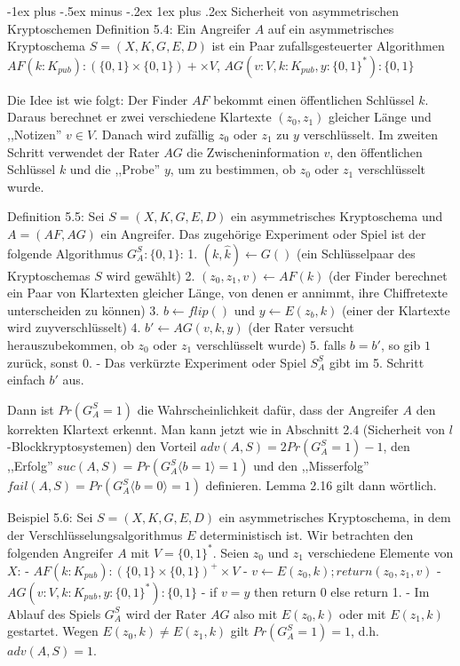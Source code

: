 \documentclass[a4paper]{article}
\makeatletter
\renewcommand{\subsubsection}{\@startsection{subsubsection}{3}{0mm}%
 {-1ex plus -.5ex minus -.2ex}%
 {1ex plus .2ex}%
 {\normalfont\small\bfseries}}
\makeatother
\begin{document}
\begin{multicols}{3}
        \subsubsection{Sicherheit von asymmetrischen Kryptoschemen}
        Definition 5.4: Ein Angreifer $A$ auf ein asymmetrisches Kryptoschema $S= (X,K,G,E,D)$ ist ein Paar zufallsgesteuerter Algorithmen $AF(k:K_{pub}):(\{0,1\}\times\{0,1\})+\times V$, $AG(v:V,k:K_{pub}, y:\{0,1\}^*) :\{0,1\}$

        Die Idee ist wie folgt: Der Finder $AF$ bekommt einen öffentlichen Schlüssel $k$. Daraus berechnet er zwei verschiedene Klartexte $(z_0,z_1)$ gleicher Länge und ,,Notizen'' $v\in V$. Danach wird zufällig $z_0$ oder $z_1$ zu $y$ verschlüsselt. Im zweiten Schritt verwendet der Rater $AG$ die Zwischeninformation $v$, den öffentlichen Schlüssel $k$ und die ,,Probe'' $y$, um zu bestimmen, ob $z_0$ oder $z_1$ verschlüsselt wurde.

        Definition 5.5: Sei $S=(X,K,G,E,D)$ ein asymmetrisches Kryptoschema und $A=(AF,AG)$ ein Angreifer. Das zugehörige Experiment oder Spiel ist der folgende Algorithmus $G^S_A:\{0,1\}$:
        1. $(k,\hat{k})\leftarrow G()$ (ein Schlüsselpaar des Kryptoschemas $S$ wird gewählt)
        2. $(z_0,z_1,v)\leftarrow AF(k)$ (der Finder berechnet ein Paar von Klartexten gleicher Länge, von denen er annimmt, ihre Chiffretexte unterscheiden zu können)
        3. $b\leftarrow flip()$ und $y\leftarrow E(z_b,k)$ (einer der Klartexte wird zuyverschlüsselt)
        4. $b'\leftarrow AG(v,k,y)$ (der Rater versucht herauszubekommen, ob $z_0$ oder $z_1$ verschlüsselt wurde)
        5. falls $b=b'$, so gib $1$ zurück, sonst $0$.
        - Das verkürzte Experiment oder Spiel $S^S_A$ gibt im 5. Schritt einfach $b'$ aus.

        Dann ist $Pr(G^S_A= 1)$ die Wahrscheinlichkeit dafür, dass der Angreifer $A$ den korrekten Klartext erkennt. Man kann jetzt wie in Abschnitt 2.4 (Sicherheit von $l$-Blockkryptosystemen) den Vorteil $adv(A,S) = 2 Pr(G^S_A = 1)- 1$, den ,,Erfolg'' $suc(A,S) = Pr(G^S_A\langle b = 1\rangle  = 1)$ und den ,,Misserfolg'' $fail(A,S) =Pr(G^S_A\langle b= 0\rangle = 1)$ definieren. Lemma 2.16 gilt dann wörtlich.

        Beispiel 5.6: Sei $S=(X,K,G,E,D)$ ein asymmetrisches Kryptoschema, in dem der Verschlüsselungsalgorithmus $E$ deterministisch ist. Wir betrachten den folgenden Angreifer $A$ mit $V=\{0,1\}^*$. Seien $z_0$ und $z_1$ verschiedene Elemente von $X$:
        - $AF(k:K_{pub}) : (\{0,1\}\times\{0,1\})^+\times V$
        - $v\leftarrow E(z_0,k);return(z_0,z_1,v)$
        - $AG(v:V,k:K_{pub},y:\{0,1\}^*):\{0,1\}$
        - if $v=y$ then return 0 else return 1.
        - Im Ablauf des Spiels $G^S_A$ wird der Rater $AG$ also mit $E(z_0,k)$ oder mit $E(z_1,k)$ gestartet. Wegen $E(z_0,k)\not=E(z_1,k)$ gilt $Pr(G^S_A=1)=1$, d.h. $adv(A,S)=1$.


\end{multicols}
\end{document}
